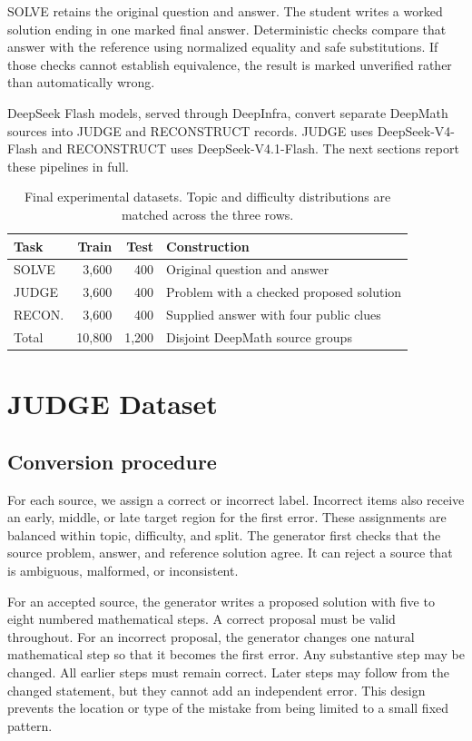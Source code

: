 \documentclass[11pt]{article}
\begin{document}
SOLVE retains the original question and answer. The student writes a worked solution ending in one marked final answer. Deterministic checks compare that answer with the reference using normalized equality and safe substitutions. If those checks cannot establish equivalence, the result is marked unverified rather than automatically wrong.

DeepSeek Flash models, served through DeepInfra, convert separate DeepMath sources into JUDGE and RECONSTRUCT records. JUDGE uses DeepSeek-V4-Flash and RECONSTRUCT uses DeepSeek-V4.1-Flash. The next sections report these pipelines in full.

\begin{table}[t]
\centering
\small
\setlength{\tabcolsep}{3pt}
\begin{tabular}{lrrp{}}
\toprule
Task & Train & Test & Construction \\
\midrule
SOLVE & 3,600 & 400 & Original question and answer \\
JUDGE & 3,600 & 400 & Problem with a checked proposed solution \\
RECON. & 3,600 & 400 & Supplied answer with four public clues \\
\midrule
Total & 10,800 & 1,200 & Disjoint DeepMath source groups \\
\bottomrule
\end{tabular}
\caption{Final experimental datasets. Topic and difficulty distributions are matched across the three rows.}
\label{tab:dataset-summary}
\end{table}

\section{JUDGE Dataset}

\subsection{Conversion procedure}

For each source, we assign a correct or incorrect label. Incorrect items also receive an early, middle, or late target region for the first error. These assignments are balanced within topic, difficulty, and split. The generator first checks that the source problem, answer, and reference solution agree. It can reject a source that is ambiguous, malformed, or inconsistent.

For an accepted source, the generator writes a proposed solution with five to eight numbered mathematical steps. A correct proposal must be valid throughout. For an incorrect proposal, the generator changes one natural mathematical step so that it becomes the first error. Any substantive step may be changed. All earlier steps must remain correct. Later steps may follow from the changed statement, but they cannot add an independent error. This design prevents the location or type of the mistake from being limited to a small fixed pattern.
\end{document}
